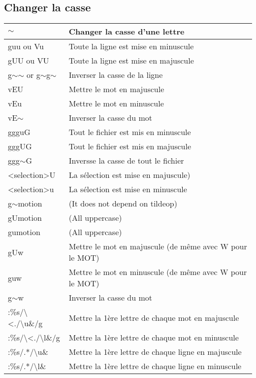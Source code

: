 \documentclass{article}
\begin{document}
                    \subsection{Changer la casse}
                    \begin{tabular}{|p{3cm}| l| }\hline
                        $\sim$ & Changer la casse d'une lettre \\ \hline
                        guu ou Vu& Toute la ligne est mise en minuscule\\ \hline
                        gUU ou VU & Toute la ligne est mise en majuscule\\ \hline
                        g$\sim$$\sim$ or g$\sim$g$\sim$ & Inverser la casse de la ligne\\ \hline
                        vEU & Mettre le mot en majuscule \\ \hline
                        vEu & Mettre le mot en minuscule\\ \hline
                        vE$\sim$ & Inverser la casse du mot\\ \hline
                        ggguG & Tout le fichier est mis en minuscule\\ \hline
                        gggUG & Tout le fichier est mis en majuscule\\ \hline
                        ggg$\sim$G & Inversse la casse de tout le fichier \\ \hline
                        <selection>U & La sélection est mise en majuscule) \\ \hline
                        <selection>u & La sélection est mise en minuscule \\ \hline
                        g$\sim$motion & (It does not depend on tildeop) \\ \hline
                        gUmotion & (All uppercase) \\ \hline
                        gumotion & (All uppercase) \\ \hline
                        gUw & Mettre le mot en majuscule (de même avec W pour le MOT)\\ \hline
                        guw & Mettre le mot en minuscule (de même avec W pour le MOT)\\ \hline
                        g$\sim$w & Inverser la casse du mot \\ \hline
                        :\%s/\textbackslash{}\textless{}./\textbackslash{}u\&/g & Mettre la 1ère lettre de chaque mot en majuscule \\ \hline
                        :\%s/\textbackslash{}\textless{}./\textbackslash{}l\&/g & Mettre la 1ère lettre de chaque mot en minuscule \\ \hline
                        :\%s/.*/\textbackslash{}u\& &	Mettre la 1ère lettre de chaque ligne en majuscule\\ \hline
                        :\%s/.*/\textbackslash{}l\& &	Mettre la 1ère lettre de chaque ligne en minuscule\\ \hline
                    \end{tabular}\\
\end{document}
